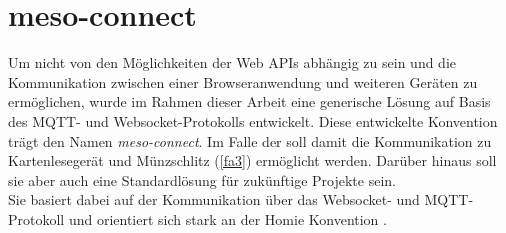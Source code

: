 \section{meso-connect}
\label{sec:meso-connect}

Um nicht von den Möglichkeiten der Web APIs abhängig zu sein und die Kommunikation
zwischen einer Browseranwendung und weiteren Geräten zu ermöglichen, wurde im Rahmen dieser
Arbeit eine generische Lösung auf Basis des MQTT- und Websocket-Protokolls entwickelt.
Diese entwickelte Konvention trägt den Namen \emph{meso-connect}.
Im Falle der \shst{} soll damit die Kommunikation zu Kartenlesegerät und Münzschlitz (\ref{fa3})
ermöglicht werden. Darüber hinaus soll sie aber auch eine Standardlösung für zukünftige 
Projekte sein. \\
Sie basiert dabei auf der Kommunikation über das Websocket- und MQTT-Protokoll und orientiert sich stark an 
der Homie Konvention \cite{homie}.



